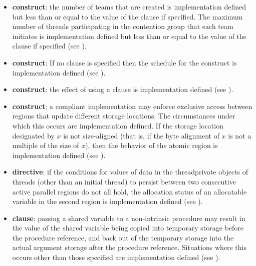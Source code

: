 \begin{itemize}
\item {} \textbf{construct}: the number of teams that are created is implementation defined but 
less than or equal to the value of the  clause if specified. The maximum 
number of threads participating in the contention group that each team initiates is 
implementation defined but less than or equal to the value of the  
clause if specified (see ). 

\item {} \textbf{construct}: If no  clause is specified then the schedule for the  
construct is implementation defined (see ). 

\item {} \textbf{construct}: the effect of using a 
clause is implementation defined (see ). 

\item {} \textbf{construct}: a compliant implementation may enforce exclusive access 
between  regions that update different storage locations. The circumstances 
under which this occurs are implementation defined. If the storage location 
designated by $x$ is not size-aligned (that is, if the byte alignment of $x$ is not a multiple 
of the size of $x$), then the behavior of the atomic region is implementation defined 
(see ).

\fortranspecificstart

\item {} \textbf{directive}: if the conditions for values of data in the threadprivate 
objects of threads (other than an initial thread) to persist between two consecutive 
active parallel regions do not all hold, the allocation status of an allocatable variable 
in the second region is implementation defined (see ).

\item {} \textbf{clause}: passing a shared variable to a non-intrinsic procedure may result in 
the value of the shared variable being copied into temporary storage before the 
procedure reference, and back out of the temporary storage into the actual argument 
storage after the procedure reference. Situations where this occurs other than those 
specified are implementation defined (see ).


\end{itemize}

